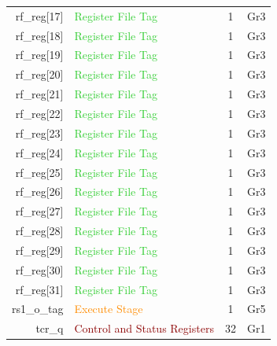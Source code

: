 \begin{table}
\begin{tabular}{rlcc}
        rf\_reg[17]                     & \textcolor{LimeGreen}{Register File Tag}          & 1    & Gr3   \\
        rf\_reg[18]                     & \textcolor{LimeGreen}{Register File Tag}          & 1    & Gr3   \\
        rf\_reg[19]                     & \textcolor{LimeGreen}{Register File Tag}          & 1    & Gr3   \\
        rf\_reg[20]                     & \textcolor{LimeGreen}{Register File Tag}          & 1    & Gr3   \\
        rf\_reg[21]                     & \textcolor{LimeGreen}{Register File Tag}          & 1    & Gr3   \\
        rf\_reg[22]                     & \textcolor{LimeGreen}{Register File Tag}          & 1    & Gr3   \\
        rf\_reg[23]                     & \textcolor{LimeGreen}{Register File Tag}          & 1    & Gr3   \\
        rf\_reg[24]                     & \textcolor{LimeGreen}{Register File Tag}          & 1    & Gr3   \\
        rf\_reg[25]                     & \textcolor{LimeGreen}{Register File Tag}          & 1    & Gr3   \\
        rf\_reg[26]                     & \textcolor{LimeGreen}{Register File Tag}          & 1    & Gr3   \\
        rf\_reg[27]                     & \textcolor{LimeGreen}{Register File Tag}          & 1    & Gr3   \\
        rf\_reg[28]                     & \textcolor{LimeGreen}{Register File Tag}          & 1    & Gr3   \\
        rf\_reg[29]                     & \textcolor{LimeGreen}{Register File Tag}          & 1    & Gr3   \\
        rf\_reg[30]                     & \textcolor{LimeGreen}{Register File Tag}          & 1    & Gr3   \\
        rf\_reg[31]                     & \textcolor{LimeGreen}{Register File Tag}          & 1    & Gr3   \\\hdashline
        rs1\_o\_tag                     & \textcolor{DarkOrange}{Execute Stage}             & 1    & Gr5   \\\hdashline
        tcr\_q                          & \textcolor{DarkRed}{Control and Status Registers} & 32   & Gr1   \\

\end{tabular}
\end{table}
